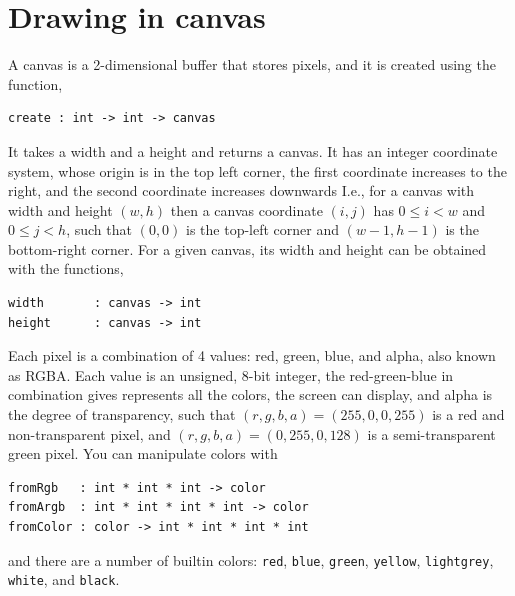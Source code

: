 \documentclass{article}
\begin{document}
\section{Drawing in canvas}
A canvas is a 2-dimensional buffer that stores pixels, and it is created using the function,
\begin{lstlisting}
create : int -> int -> canvas
\end{lstlisting}
It takes a width and a height and returns a canvas. It has an integer coordinate system, whose origin is in the top left corner, the first coordinate increases to the right, and the second coordinate increases downwards I.e., for a canvas with width and height $(w,h)$ then a canvas coordinate $(i,j)$ has $0\leq i < w$ and $0\leq j < h$, such that $(0,0)$ is the top-left corner and $(w-1,h-1)$ is the bottom-right corner. For a given canvas, its width and height can be obtained with the functions,
\begin{lstlisting}
width       : canvas -> int
height      : canvas -> int
\end{lstlisting}

Each pixel is a combination of 4 values: red, green, blue, and alpha, also known as RGBA. Each value is an unsigned, 8-bit integer, the red-green-blue in combination gives represents all the colors, the screen can display, and alpha is the degree of transparency, such that $(r,g,b,a) = (255,0,0,255)$ is a red and non-transparent pixel, and $(r,g,b,a) = (0,255,0,128)$ is a semi-transparent green pixel. You can manipulate colors with 
\begin{lstlisting}
fromRgb   : int * int * int -> color
fromArgb  : int * int * int * int -> color
fromColor : color -> int * int * int * int
\end{lstlisting}
and there are a number of builtin colors: \lstinline{red}, \lstinline{blue}, \lstinline{green}, \lstinline{yellow}, \lstinline{lightgrey}, \lstinline{white}, and \lstinline{black}.
\end{document}
